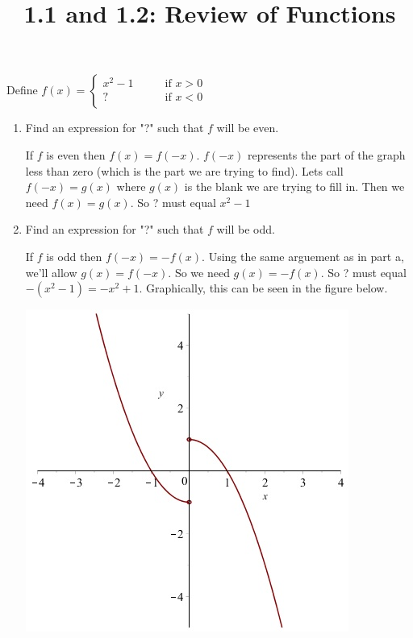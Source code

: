 \documentclass[handout]{ximera}
\title{1.1 and 1.2:  Review of Functions}
\begin{document}
\begin{abstract}		\end{abstract}
\maketitle






\begin{problem}
Define 
	$f(x) =   \left\{ \begin{array}{cl}
	x^2-1		 	&	\qquad \text{if } x > 0					\\
	\text{? }			&	\qquad \text{if }  x < 0 	\\		\end{array} \right.  $
\begin{enumerate}	
	\item  Find an expression for "?" such that $f$ will be even.
	
	\begin{freeResponse} 
			If $f$ is even then $f(x)=f(-x)$.  $f(-x)$ represents the part of the graph less than zero (which is the part we are trying to find).  Lets call $f(-x)=g(x)$ where $g(x)$ is 			the blank we are trying to fill in.  Then we need $f(x)=g(x)$.  So ? must equal $x^2-1$
	\end{freeResponse}
	
	\item  Find an expression for "?" such that $f$ will be odd.
	
	\begin{freeResponse}
	   If $f$ is odd then $f(-x)=-f(x)$.  Using the same arguement as in part a, we'll allow $g(x)=f(-x)$.  So we need $g(x)=-f(x)$.  So ? must equal $-(x^2-1) =-x^2+1$.  Graphically, this 		can be seen in the figure below.

	\begin{image}		
	\includegraphics{Figure3.jpg}
	\end{image}
		


\end{freeResponse}
\end{enumerate}
\end{problem}
\end{document}
